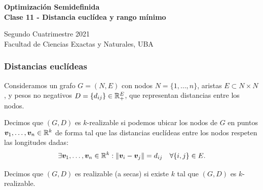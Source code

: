 \documentclass[aspectratio=169,12pt,spanish]{beamer}
\begin{document}

\begin{frame}

 \begin{center}

\Large\textbf{Optimización Semidefinida} \\
\large\textbf{Clase 11 - Distancia euclídea y rango mínimo}




\vspace{1cm}
 Segundo Cuatrimestre 2021
 \\
 {\small Facultad de Ciencias Exactas y Naturales, UBA}
 \end{center}

\end{frame}




\begin{frame}
\frametitle{Distancias euclídeas}

Consideramos un grafo $G = (N, E)$ con nodos $N = \{1, \dots, n\}$, aristas $E \subset N \times N$, y pesos no negativos $D = \{d_{ij}\} \in \mathbb{R}_+^E$, que representan distancias entre los nodos.

Decimos que $(G, D)$ es $k$-realizable si podemos ubicar los nodos de $G$ en puntos $\bm{v}_1, \dots, \bm{v}_n \in \mathbb{R}^k$ de forma tal que las distancias euclídeas entre los nodos respeten las longitudes dadas:
$$
\exists \bm{v}_1, \dots, \bm{v}_n \in \mathbb{R}^k:  \| \bm{v}_i - \bm{v}_j \| = d_{ij} \quad \forall \{i, j\} \in E.
$$

Decimos que $(G, D)$ es realizable (a secas) si existe $k$ tal que $(G, D)$ es $k$-realizable.

\end{frame}

\end{document}

